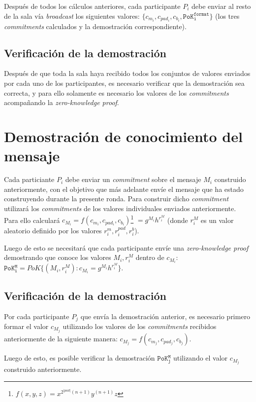 Después de todos los cálculos anteriores, cada participante $P_i$ debe enviar 
al resto de la sala vía \emph{broadcast} los siguientes valores: 
$\{c_{m_i}, c_{pad_i}, c_{b_i}, \mathtt{PoK_i^{format}}\}$ (los tres \emph{commitments} 
calculados y la demostración correspondiente).

\subsection{Verificación de la demostración}

Después de que toda la sala haya recibido todos los conjuntos de valores enviados 
por cada uno de los participantes, es necesario verificar que la demostración sea 
correcta, y para ello solamente es necesario los valores de los \emph{commitments} 
acompañando la \emph{zero-knowledge proof}.

\section{Demostración de conocimiento del mensaje}

Cada particiante $P_i$ debe enviar un \emph{commitment} sobre el mensaje $M_i$ 
construido anteriormente, con el objetivo que más adelante envíe el mensaje que 
ha estado construyendo durante la presente ronda. Para construir dicho \emph{commitment} 
utilizará los \emph{commitments} de los valores individuales enviados anteriormente. 
Para ello calculará 
$c_{M_i} = f(c_{m_i}, c_{pad_i}, c_{b_i})$\footnote{$f(x, y, z) = x^{2^{|pad|}(n+1)} y^{(n+1)} z$} 
$= g^{M_i} h^{r_i^{M}}$ (donde $r_i^{M}$ es un valor aleatorio definido por los 
valores $r_i^m, r_i^{pad}, r_i^b$). 

Luego de esto se necesitará que cada participante envíe una \emph{zero-knowledge proof} 
demostrando que conoce los valores $M_i, r_i^M$ dentro de $c_{M_i}$: 
$\mathtt{PoK_i^M} = PoK\{(M_i, r_i^M) : c_{M_i} = g^{M_i} h^{r_i^M}\}$.

\subsection{Verificación de la demostración}

Por cada participante $P_j$ que envía la demostración anterior, es necesario primero 
formar el valor $c_{M_j}$ utilizando los valores de los \emph{commitments} recibidos 
anteriormente de la siguiente manera: $c_{M_j} = f(c_{m_j}, c_{pad_j}, c_{b_j})$.

Luego de esto, es posible verificar la demostración $\mathtt{PoK_j^M}$ utilizando el 
valor $c_{M_j}$ construido anteriormente.

